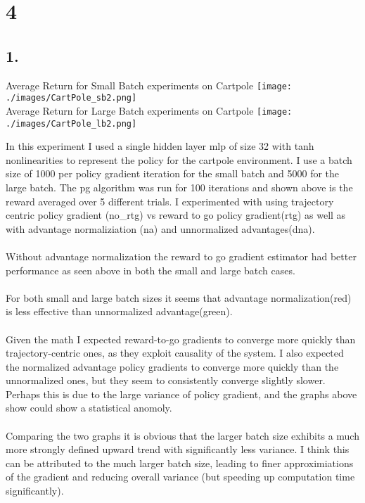\documentclass[12pt]{report}
\begin{document}
\section*{4}
\subsection*{1.}
\begin{center}
Average Return for Small Batch experiments on Cartpole
\texttt{[image: ./images/CartPole\_sb2.png]}\\
Average Return for Large Batch experiments on Cartpole
\texttt{[image: ./images/CartPole\_lb2.png]}
\end{center}
In this experiment I used a single hidden layer mlp of size 32 with tanh nonlinearities to represent the policy for the cartpole environment. I use a batch size of 1000 per policy gradient iteration for the small batch and 5000 for the large batch. The pg algorithm was run for 100 iterations and shown above is the reward averaged over 5 different trials. I experimented with using trajectory centric policy gradient (no\_rtg) vs reward to go policy gradient(rtg) as well as with advantage normaliziation (na) and unnormalized advantages(dna).\\
\\
Without advantage normalization the reward to go gradient estimator had better performance as seen above in both the small and large batch cases.\\
\\
For both small and large batch sizes it seems that advantage normalization(red) is less effective than unnormalized advantage(green).\\
\\
Given the math I expected reward-to-go gradients to converge more quickly than trajectory-centric ones, as they exploit causality of the system. I also expected the normalized advantage policy gradients to converge more quickly than the unnormalized ones, but they seem to consistently converge slightly slower. Perhaps this is due to the large variance of policy gradient, and the graphs above show could show a statistical anomoly. \\
\\
Comparing the two graphs it is obvious that the larger batch size exhibits a much more strongly defined upward trend with significantly less variance. I think this can be attributed to the much larger batch size, leading to finer approximiations of the gradient and reducing overall variance (but speeding up computation time significantly).
\end{document}
